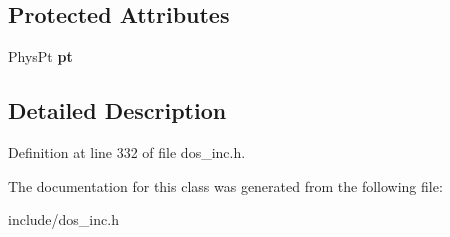 \subsection*{Protected Attributes}
\begin{DoxyCompactItemize}
\item 
\hypertarget{classMemStruct_acac6123c566805e45fb8ff9e7744d3e2}{Phys\-Pt {\bfseries pt}}\label{classMemStruct_acac6123c566805e45fb8ff9e7744d3e2}

\end{DoxyCompactItemize}


\subsection{Detailed Description}


Definition at line 332 of file dos\-\_\-inc.\-h.



The documentation for this class was generated from the following file\-:\begin{DoxyCompactItemize}
\item 
include/dos\-\_\-inc.\-h\end{DoxyCompactItemize}
